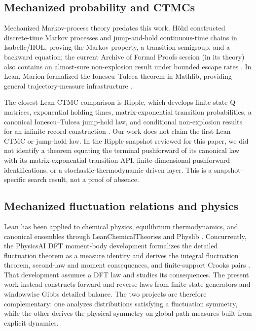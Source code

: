 \subsection{Mechanized probability and CTMCs}

Mechanized Markov-process theory predates this work. H\"olzl constructed discrete-time Markov processes and jump-and-hold continuous-time chains in Isabelle/HOL, proving the Markov property, a transition semigroup, and a backward equation; the current Archive of Formal Proofs session (in its  theory) also contains an almost-sure non-explosion result under bounded escape rates \parencite{Hoelzl2017,AFPMarkovModels}. In Lean, Marion formalized the Ionescu--Tulcea theorem in Mathlib, providing general trajectory-measure infrastructure \parencite{Marion2025}.

The closest Lean CTMC comparison is Ripple, which develops finite-state Q-matrices, exponential holding times, matrix-exponential transition probabilities, a canonical Ionescu--Tulcea jump-hold law, and conditional non-explosion results for an infinite record construction \parencite{Ripple2026}. Our work does not claim the first Lean CTMC or jump-hold law. In the Ripple snapshot reviewed for this paper, we did not identify a theorem equating the terminal pushforward of its canonical law with its matrix-exponential transition API, finite-dimensional pushforward identifications, or a stochastic-thermodynamic driven layer. This is a snapshot-specific search result, not a proof of absence.

\subsection{Mechanized fluctuation relations and physics}

Lean has been applied to chemical physics, equilibrium thermodynamics, and canonical ensembles through LeanChemicalTheories and Physlib \parencite{Bobbin2024,Physlib}. Concurrently, the PhysicsAI DFT moment-body development formalizes the detailed fluctuation theorem as a measure identity and derives the integral fluctuation theorem, second-law and moment consequences, and finite-support Crooks pairs \parencite{PhysicsAIDFT}. That development assumes a DFT law and studies its consequences. The present work instead constructs forward and reverse laws from finite-state generators and windowwise Gibbs detailed balance. The two projects are therefore complementary: one analyzes distributions satisfying a fluctuation symmetry, while the other derives the physical symmetry on global path measures built from explicit dynamics.


